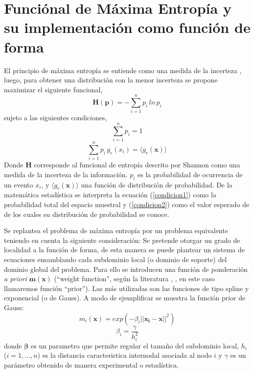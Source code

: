 \chapter{Funciónal de Máxima Entropía y su implementación como función de forma}

El principio de máxima entropía se entiende como una medida de la incerteza \citep{jaynes}, luego, para obtener una distribución con la menor incerteza se propone maximizar el siguiente funcional,
\begin{equation}
 \bm{H} (\bm{p}) = - \sum_{i=1}^{n} p_i \, ln \, p_i 
\end{equation}
sujeto a las siguientes condiciones,
\begin{equation}
\label{condicion1} \sum_{i=1}^{n} p_i = 1 
\end{equation}
\begin{equation} \label{condicion2} \sum_{i=1}^{n} p_i \, g_r (x_i) = \langle g_r (\bm{x}) \rangle 
\end{equation}
Donde $\bm{H}$ corresponde al funcional de entropía descrito por Shannon \citep{shannon} como una medida de la incerteza de la información. $p_i$ es la probabilidad de ocurrencia de un evento $x_i$, y $\langle g_r(\bm{x}) \rangle$
una función de distribución de probabilidad. De la matemática estadística se interpreta la ecuación (\ref{condicion1}) como la probabilidad total del espacio muestral y (\ref{condicion2}) como el valor esperado de de los cuales su distribución de probabilidad se conoce.

Se replantea el problema de máxima entropía por un problema equivalente teniendo en cuenta la siguiente consideración: Se pretende otorgar un grado de localidad a la función de forma, de esta manera se puede plantear un sistema de ecuaciones ensamblando cada subdominio local (o dominio de soporte) del dominio global del problema. Para ello se introducen una función de ponderación \textit{a priori} $\bm{m}(\bm{x})$ (``weight function'', según la literatura \citep{liu-intro}, \citep{liu-mf}, en este caso llamaremos función ``prior''). Las más utilizadas son las funciones de tipo spline y exponencial (o de Gauss). A modo de ejemplificar se muestra la función prior de Gauss:
\begin{equation} 
m_i (\bm{x}) = exp( -\beta_i || \bm{x_i} - \bm{x} ||^2 )
\end{equation}
\begin{equation}
 \beta_i=\frac{\gamma}{h_i^2} 
\end{equation}
donde $\bm{\beta}$ es un parametro que permite regular el tamaño del subdominio local,
$h_i$ ($i=1,\ldots,n$) es la distancia caracteristica internodal asociada al nodo $i$ y $\gamma$ es un parámetro obtenido de manera experimental o estadística.\\

